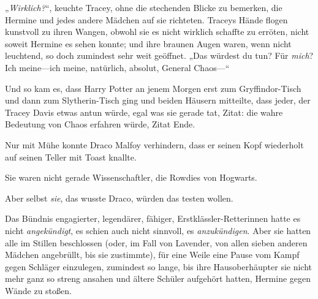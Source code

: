 „\emph{Wirklich?}“, keuchte Tracey, ohne die stechenden Blicke zu bemerken, die Hermine und jedes andere Mädchen auf sie richteten. Traceys Hände flogen kunstvoll zu ihren Wangen, obwohl sie es nicht wirklich schaffte zu erröten, nicht soweit Hermine es sehen konnte; und ihre braunen Augen waren, wenn nicht leuchtend, so doch zumindest sehr weit geöffnet.
„Das würdest du tun? Für \emph{mich}? Ich meine—ich meine, natürlich, absolut, General Chaos—“

\later

Und so kam es, dass Harry Potter an jenem Morgen erst zum Gryffindor-Tisch und dann zum Slytherin-Tisch ging und beiden Häusern mitteilte, dass jeder, der Tracey Davis etwas antun würde, egal was sie gerade tat, Zitat: die wahre Bedeutung von Chaos erfahren würde, Zitat Ende.

Nur mit Mühe konnte Draco Malfoy verhindern, dass er seinen Kopf wiederholt auf seinen Teller mit Toast knallte.

Sie waren nicht gerade Wissenschaftler, die Rowdies von Hogwarts.

Aber selbst \emph{sie}, das wusste Draco, würden das testen wollen.

\later

Das Bündnis engagierter, legendärer, fähiger, Erstklässler-Retterinnen hatte es nicht \emph{angekündigt}, es schien auch nicht sinnvoll, es \emph{anzukündigen}. Aber sie hatten alle im Stillen beschlossen (oder, im Fall von Lavender, von allen sieben anderen Mädchen angebrüllt, bis sie zustimmte), für eine Weile eine Pause vom Kampf gegen Schläger einzulegen, zumindest so lange, bis ihre Hausoberhäupter sie nicht mehr ganz so streng ansahen und ältere Schüler aufgehört hatten, Hermine gegen Wände zu stoßen.

